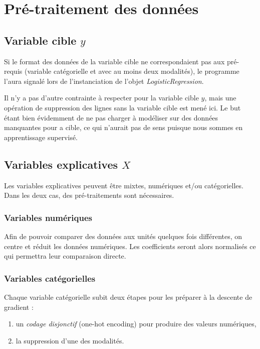 \documentclass[10pt,french]{report}
\begin{document}
	\section{Pré-traitement des données}
	
	\subsection{Variable cible $y$}
	
	Si le format des données de la variable cible ne correspondaient pas aux pré-requis (variable catégorielle et avec au moins deux modalités), le programme l'aura signalé lors de l'instanciation de l'objet \textit{LogisticRegression}.
	
	Il n'y a pas d'autre contrainte à respecter pour la variable cible $y$, mais une opération de suppression des lignes sans la variable cible est mené ici. Le but étant bien évidemment de ne pas charger à modéliser sur des données manquantes pour a cible, ce qui n'aurait pas de sens puisque nous sommes en apprentissage supervisé.
	
	\subsection{Variables explicatives $X$}
	
	Les variables explicatives peuvent être mixtes, numériques et/ou catégorielles. Dans les deux cas, des pré-traitements sont nécessaires.
	
	\subsubsection{Variables numériques}
	
	Afin de pouvoir comparer des données aux unités quelques fois différentes, on centre et réduit les données numériques. Les coefficients seront alors normalisés ce qui permettra leur comparaison directe.
	
	\subsubsection{Variables catégorielles}
	
	Chaque variable catégorielle subit deux étapes pour les préparer à la descente de gradient :
	
	\begin{enumerate}
		\item un \textit{codage disjonctif} (one-hot encoding) pour produire des valeurs numériques,
		\item la suppression d'une des modalités.
	\end{enumerate}
	
\end{document}
